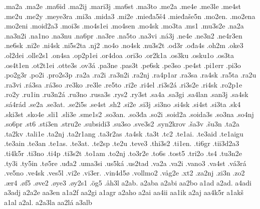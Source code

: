 {    .ma2a
    .ma2e
    .ma6id
    .ma2ij
    .mari3j
    .ma6st
    .ma3to
    .me2a
    .me4e
    .me3le
    .me4st
    .me2u
    .me2y
    .meye3ra
    .mi3a
    .mida3
    .mi2e
    .mieđa5š4
    .mieđaše5n
    .mo2en.
    .mo2ena
    .mo2eni
    .moid2a3
    .moi3s
    .mo4s1ei
    .mo4sen
    .mo4sk
    .mo3ta
    .ms1
    .mu3s2e
    .na2a
    .na3n2i
    .na1no
    .na3nu
    .na6pr
    .na3re
    .na5to
    .na3vi
    .ná3j
    .ne4e
    .ne3n2
    .ne4r3en
    .ne6sk
    .ni2e
    .ni4sk
    .ni5s2ta
    .nj2
    .no4o
    .no4sk
    .nu3s2t
    .od3r
    .ođa4s
    .oh2m
    .oke3
    .ol2dei
    .olle2s1
    .on4sa
    .op2p1ei
    .or4doa
    .ori3o
    .or2k1a
    .os3ku
    .osku1o
    .os3ta
    .os4t1en
    .ot2t1ei
    .otte3s
    .ov3á
    .pa3ne
    .pas3t
    .pe6sk
    .pe3so
    .pe4st
    .pi1err
    .pi3o
    .po2g3r
    .po2i
    .pro2s3p
    .ra2a
    .ra2i
    .ra3n2i
    .ra2nj
    .ra4p1ar
    .ra3sa
    .ra4sk
    .ra5ta
    .ra2u
    .ra3vi
    .rá3sa
    .rá3so
    .re3ko
    .re3le
    .re5to
    .ri2e
    .ri4el
    .ri3s2á
    .ri3s2e
    .ri4sk
    .ro2p1e
    .ro2y
    .ru1in
    .ru3n2á
    .ru3no
    .rusa3s
    .rys2
    .ry3st
    .sa4a
    .sa3gi
    .sa4lan
    .san3j
    .sa4sk
    .sá4rád
    .se2a
    .se3at.
    .se2i5s
    .se4st
    .sh2
    .si2e
    .si3j
    .si3no
    .si4sk
    .si4st
    .si3ta
    .sk4
    .ski3st
    .sko4e
    .sli1
    .sli3e
    .sme1s2
    .so3an.
    .so3đa
    .so2i
    .soid2a
    .soida3s
    .so3na
    .so4nj
    .so6pr
    .st6
    .sti3en
    .stru2e
    .subsidi3
    .su3so
    .sve3s2
    .syn2krov
    .ša3v
    .šu3n
    .ta2a
    .ta2kv
    .tali1e
    .ta2nj
    .ta2r1ang
    .ta3r2as
    .ta4sk
    .ta3t
    .tc2
    .te1ai.
    .te3aid
    .te1aigu
    .te3ain
    .te3an
    .te1as.
    .te3at.
    .te2sp
    .te2u
    .teve3
    .thi3s2
    .ti1en.
    .ti6gr
    .tii3d2a3
    .ti4k5r
    .ti3no
    .ti4p
    .ti3s2t
    .to1am
    .to2nj
    .to3r2e
    .to6s
    .tost5
    .tri2o
    .ts4
    .tu3n2e
    .ty3i
    .ty5in
    .tø5re
    .uđa2
    .uma3si
    .us5ká
    .us2tad
    .va2a
    .va2i
    .vano3
    .va4st
    .vá3rá
    .ve5no
    .ve4sk
    .ves5l
    .vi2e
    .vi3er.
    .vin4d5ø
    .vollmo2
    .våg2e
    .xt2
    .za2nj
    .zi3n
    .zo2
    .ær4
    .øf5
    .øve2
    .øye3
    .øy2s1
    .ög5
    .åh3l
    a2ab.
    a2aba
    a2abi
    aa2bo
    a1ad
    a2ad.
    a4adi
    a3adj
    a2a2e
    aa3en
    a1a2f
    aa2gi
    a1agr
    a2aho
    a2ai
    aa4ii
    aa1ik
    a2aj
    aa4k5r
    a1akš
    a1al
    a2al.
    a2a3la
    aa2lá
    a3alb
}
